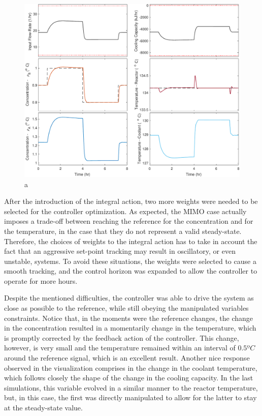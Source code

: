 \documentclass[a4paper,11pt]{book}
\numberwithin{figure}{chapter}
\numberwithin{equation}{chapter}
\numberwithin{table}{chapter}
\theoremstyle{definition}
\begin{document}
\begin{figure}[ht] \centering
	\includegraphics[width=\textwidth]{chapter7/lqri01}
	
	\caption{a}
	\label{fig:lqri01}
\end{figure}

After the introduction of the integral action, two more weights were needed to be selected for the controller optimization. As expected, the MIMO case actually imposes a trade-off between reaching the reference for the concentration and for the temperature, in the case that they do not represent a valid steady-state. Therefore, the choices of weights to the integral action has to take in account the fact that an aggressive set-point tracking may result in oscillatory, or even unstable, systems. To avoid these situations, the weights were selected to cause a smooth tracking, and the control horizon was expanded to allow the controller to operate for more hours. 

Despite the mentioned difficulties, the controller was able to drive the system as close as possible to the reference, while still obeying the manipulated variables constraints. Notice that, in the moments were the reference changes, the change in the concentration resulted in a momentarily change in the temperature, which is promptly corrected by the feedback action of the controller. This change, however, is very small and the temperature remained within an interval of $0.5ºC$ around the reference signal, which is an excellent result. Another nice response observed in the visualization comprises in the change in the coolant temperature, which follows closely the shape of the change in the cooling capacity. In the last simulations, this variable evolved in a similar manner to the reactor temperature, but, in this case, the first was directly manipulated to allow for the latter to stay at the steady-state value.
\end{document}
